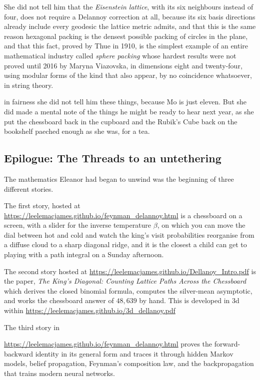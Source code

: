 She did not tell him that the \emph{Eisenstein lattice}, with its
six neighbours instead of four, does not require a Delannoy
correction at all, because its six basis directions already include
every geodesic the lattice metric admits, and that this is the same
reason hexagonal packing is the densest possible packing of circles
in the plane, and that this fact, proved by Thue in 1910, is the
simplest example of an entire mathematical industry called
\emph{sphere packing} whose hardest results were not proved until
2016 by Maryna Viazovska, in dimensions eight and twenty-four,
using modular forms of the kind that also appear, by no coincidence
whatsoever, in string theory.
 
in fairness she did not tell him these things, because Mo is just eleven. But she did made a mental note of the things he might be ready to hear next year, as she
put the chessboard back in the cupboard and the Rubik's Cube back on the bookshelf paeched enough as she was, for a tea.
  
\subsection*{Epilogue: The Threads to an untethering}
 
The mathematics Eleanor had began to unwind was the beginning of three
different stories.
 
The first story, hosted at \url{https://leelemacjames.github.io/feynman_delannoy.html} is a chessboard on a screen, with a slider for the inverse temperature $\beta$, on which you can move the dial between hot and cold and watch the king's visit probabilities reorganise from a diffuse cloud to a sharp diagonal ridge, and it
is the closest a child can get to playing with a path integral on a Sunday afternoon.

 
The second story  hosted at
\url{https://leelemacjames.github.io/Dellanoy_Intro.pdf} is the paper,
\emph{The King's Diagonal: Counting Lattice Paths Across the
Chessboard} which derives the closed binomial
formula, computes the silver-mean asymptotic, and works the chessboard answer of $48{,}639$ by hand. This is developed in 3d within 
\url{https://leelemacjames.github.io/3d_dellanoy.pdf}
 
The third story in 

\noindent
\url{https://leelemacjames.github.io/feynman_delannoy.html}
proves the forward-backward identity in its general form and traces it through hidden Markov models, belief propagation, Feynman's composition law, and the backpropagation that trains modern neural networks.

